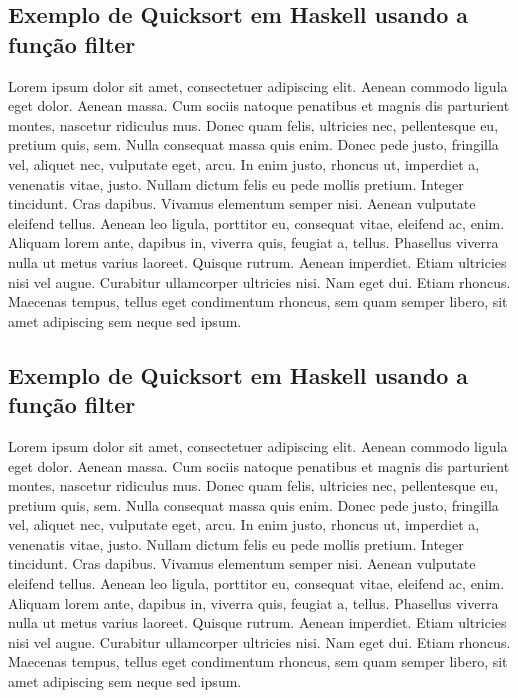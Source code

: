 \subsection{Exemplo de Quicksort em Haskell usando a função filter}

    Lorem ipsum dolor sit amet, consectetuer adipiscing 
    elit. Aenean commodo ligula eget dolor. Aenean massa.
    Cum sociis natoque penatibus et magnis dis parturient
    montes, nascetur ridiculus mus. Donec quam felis, 
    ultricies nec, pellentesque eu, pretium quis, sem. 
    Nulla consequat massa quis enim. Donec pede justo, 
    fringilla vel, aliquet nec, vulputate eget, arcu. In 
    enim justo, rhoncus ut, imperdiet a, venenatis vitae,
    justo. Nullam dictum felis eu pede mollis pretium. 
    Integer tincidunt. Cras dapibus. Vivamus elementum 
    semper nisi. Aenean vulputate eleifend tellus. Aenean 
    leo ligula, porttitor eu, consequat vitae, eleifend 
    ac, enim. Aliquam lorem ante, dapibus in, viverra 
    quis, feugiat a, tellus. Phasellus viverra nulla ut 
    metus varius laoreet. Quisque rutrum. Aenean imperdiet.
    Etiam ultricies nisi vel augue. Curabitur ullamcorper 
    ultricies nisi. Nam eget dui. Etiam rhoncus. Maecenas 
    tempus, tellus eget condimentum rhoncus, sem quam 
    semper libero, sit amet adipiscing sem neque sed ipsum.
\subsection{Exemplo de Quicksort em Haskell usando a função filter} 

    Lorem ipsum dolor sit amet, consectetuer adipiscing 
    elit. Aenean commodo ligula eget dolor. Aenean massa.
    Cum sociis natoque penatibus et magnis dis parturient
    montes, nascetur ridiculus mus. Donec quam felis, 
    ultricies nec, pellentesque eu, pretium quis, sem. 
    Nulla consequat massa quis enim. Donec pede justo, 
    fringilla vel, aliquet nec, vulputate eget, arcu. In 
    enim justo, rhoncus ut, imperdiet a, venenatis vitae,
    justo. Nullam dictum felis eu pede mollis pretium. 
    Integer tincidunt. Cras dapibus. Vivamus elementum 
    semper nisi. Aenean vulputate eleifend tellus. Aenean 
    leo ligula, porttitor eu, consequat vitae, eleifend 
    ac, enim. Aliquam lorem ante, dapibus in, viverra 
    quis, feugiat a, tellus. Phasellus viverra nulla ut 
    metus varius laoreet. Quisque rutrum. Aenean imperdiet.
    Etiam ultricies nisi vel augue. Curabitur ullamcorper 
    ultricies nisi. Nam eget dui. Etiam rhoncus. Maecenas 
    tempus, tellus eget condimentum rhoncus, sem quam 
    semper libero, sit amet adipiscing sem neque sed ipsum.

\nocite{beginnersbook}
\nocite{qastack}
\nocite{haskellreport98}
\nocite{progfuncional}

\newpage